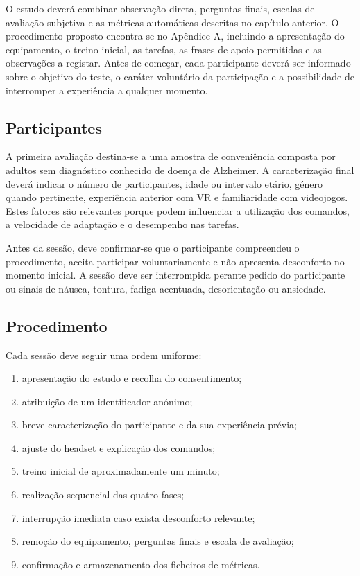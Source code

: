 \documentclass[12pt,a4paper,oneside]{report}
\begin{document}
O estudo deverá combinar observação direta, perguntas finais, escalas de avaliação subjetiva e as métricas automáticas descritas no capítulo anterior. O procedimento proposto encontra-se no Apêndice A, incluindo a apresentação do equipamento, o treino inicial, as tarefas, as frases de apoio permitidas e as observações a registar. Antes de começar, cada participante deverá ser informado sobre o objetivo do teste, o caráter voluntário da participação e a possibilidade de interromper a experiência a qualquer momento.

\subsection{Participantes}

A primeira avaliação destina-se a uma amostra de conveniência composta por adultos sem diagnóstico conhecido de doença de Alzheimer. A caracterização final deverá indicar o número de participantes, idade ou intervalo etário, género quando pertinente, experiência anterior com \ac{VR} e familiaridade com videojogos. Estes fatores são relevantes porque podem influenciar a utilização dos comandos, a velocidade de adaptação e o desempenho nas tarefas.

Antes da sessão, deve confirmar-se que o participante compreendeu o procedimento, aceita participar voluntariamente e não apresenta desconforto no momento inicial. A sessão deve ser interrompida perante pedido do participante ou sinais de náusea, tontura, fadiga acentuada, desorientação ou ansiedade.

\subsection{Procedimento}

Cada sessão deve seguir uma ordem uniforme:

\begin{enumerate}
    \item apresentação do estudo e recolha do consentimento;
    \item atribuição de um identificador anónimo;
    \item breve caracterização do participante e da sua experiência prévia;
    \item ajuste do headset e explicação dos comandos;
    \item treino inicial de aproximadamente um minuto;
    \item realização sequencial das quatro fases;
    \item interrupção imediata caso exista desconforto relevante;
    \item remoção do equipamento, perguntas finais e escala de avaliação;
    \item confirmação e armazenamento dos ficheiros de métricas.
\end{enumerate}
\end{document}
